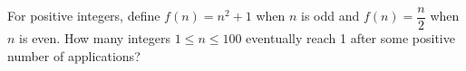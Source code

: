 For positive integers, define $f(n)=n^2+1$ when $n$ is odd and $f(n)=\dfrac{n}{2}$ when $n$ is even. How many integers $1\le n\le100$ eventually reach 1 after some positive number of applications?

